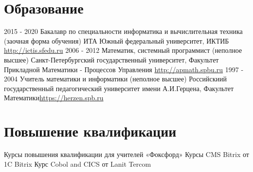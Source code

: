 \documentclass[11pt,a4paper]{moderncv}
\begin{document}
\section{Образование}
  \cventry
    {2015 - 2020}%
    {Бакалавр по специальности информатика и вычислительная техника (заочная форма обучения)}
    {\newline{} ИТА Южный федеральный университет, ИКТИБ}
    {\url{http://ictis.sfedu.ru}}{}{}
  \cventry
    {2006 - 2012}%
    {Математик, системный программист (неполное высшее)}
    {\newline{} Санкт-Петербургский государственный университет, Факультет 
    Прикладной \newline{}Математики - Процессов Управления}
    {\url{http://apmath.spbu.ru}}{}{}
  \cventry
    {1997 - 2004}%
    {Учитель математики и информатики (неполное высшее)}
    {\newline{}Российскиий государственный педагогический университет имени А.И.Герцена, 
    Факультет Математики}{\url{https://herzen.spb.ru}}{}{}
  \section{Повышение квалификации}
  \cventry
    {}%
    {Курсы повышения квалификации для учителей «Фоксфорд»}{}
    {}{}{}
\cventry
    {}
    {Курсы CMS Bitrix от 1C Bitrix}
    {}
    {}{}{}
  \cventry
    {}
    {Курс Cobol and CICS от Lanit Tercom}
    {}
    {}{}{}
\end{document}

